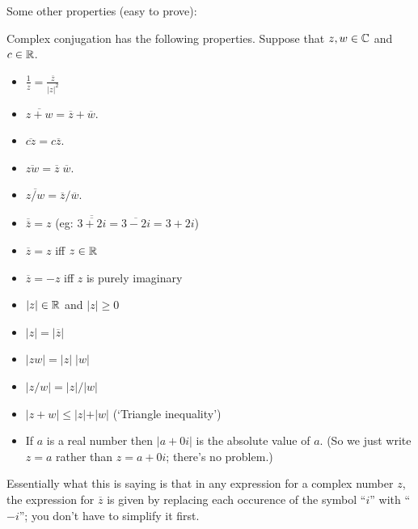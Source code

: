 Some other properties (easy to prove):

\begin{lemma} 
Complex conjugation has the following properties.  Suppose that
$z,w \in \mathbb{C}$ and $c\in \mathbb{R}$.  
\begin{itemize}
\item $\displaystyle \frac{1}{z} = \frac{\overline{z}}{\vert z \vert^2}$\smallskip
\item $\overline{z+w} = \overline{z} + \overline{w}$.
\item $\overline{cz} = c\overline{z}$.
\item $\overline{zw} =\overline{z}\; \overline{w}$.
\item $\overline{z/w} = \overline{z}/\overline{w}$.\smallskip
\item $\overline{\overline{z}} = z$ (eg:  $\overline{\overline{3+2i}}= \overline{3-2i} = 3+2i$)
\item $\overline{z} = z$ iff $z \in \mathbb{R}$
\item $\overline{z} = -z$ iff $z$ is purely imaginary


\item $\vert z \vert \in \mathbb{R}$ and $\vert z \vert \geq 0$
\item $\vert z \vert = \vert \overline{z} \vert$
\item $\vert zw \vert = \vert z \vert \; \vert w \vert$
\item $\vert z/w \vert = \vert z \vert / \vert w \vert$
\item $\vert z + w \vert \leq \vert z \vert + \vert w \vert$ (`Triangle inequality')
\item If $a$ is a real number then $\vert a + 0i \vert$ is the 
absolute value of $a$.  (So we just write $z=a$ rather than
$z=a+0i$; there's no problem.)


\end{itemize}
Essentially what this is saying is that in any expression for a complex number $z$, the expression for
$\overline{z}$ is given by replacing each occurence of the symbol ``$i$''
with ``$-i$''; you don't have to simplify it first.
\end{lemma}

